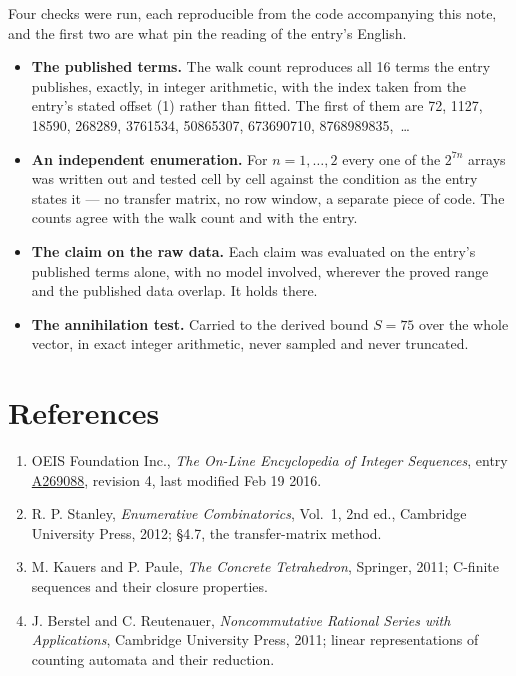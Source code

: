 \documentclass[11pt]{article}
\theoremstyle{definition}
\begin{document}
Four checks were run, each reproducible from the code accompanying this note, and the first two are what pin the reading of the entry's English.

\begin{itemize}

\item {\bfseries The published terms.} The walk count reproduces all 16 terms the entry publishes, exactly, in integer arithmetic, with the index taken from the entry's stated offset (1) rather than fitted. The first of them are 72, 1127, 18590, 268289, 3761534, 50865307, 673690710, 8768989835,~\dots

\item {\bfseries An independent enumeration.} For $n = 1,\dots,2$ every one of the $2^{7n}$ arrays was written out and tested cell by cell against the condition as the entry states it --- no transfer matrix, no row window, a separate piece of code. The counts agree with the walk count and with the entry.

\item {\bfseries The claim on the raw data.} Each claim was evaluated on the entry's published terms alone, with no model involved, wherever the proved range and the published data overlap. It holds there.

\item {\bfseries The annihilation test.} Carried to the derived bound $S = 75$ over the whole vector, in exact integer arithmetic, never sampled and never truncated.

\end{itemize}

\section{References}

\begin{enumerate}

\item OEIS Foundation Inc., \emph{The On-Line Encyclopedia of Integer Sequences}, entry \href{https://oeis.org/A269088}{A269088}, revision 4, last modified Feb 19 2016.

\item R. P. Stanley, \emph{Enumerative Combinatorics}, Vol.~1, 2nd ed., Cambridge University Press, 2012; \S4.7, the transfer-matrix method.

\item M. Kauers and P. Paule, \emph{The Concrete Tetrahedron}, Springer, 2011; C-finite sequences and their closure properties.

\item J. Berstel and C. Reutenauer, \emph{Noncommutative Rational Series with Applications}, Cambridge University Press, 2011; linear representations of counting automata and their reduction.

\end{enumerate}
\end{document}
